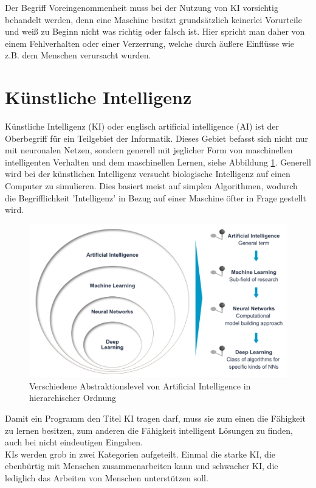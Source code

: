 \documentclass[12pt,oneside,a4paper,parskip]{scrbook}
\begin{document}
Der Begriff Voreingenommenheit muss bei der Nutzung von KI vorsichtig behandelt werden, denn eine Maschine besitzt grundsätzlich keinerlei Vorurteile und weiß zu Beginn nicht was richtig oder falsch ist. Hier spricht man daher von einem Fehlverhalten oder einer Verzerrung, welche durch äußere Einflüsse wie z.B. dem Menschen verursacht wurden.\\

\section{Künstliche Intelligenz}
Künstliche Intelligenz (KI) oder englisch artificial intelligence (AI) ist der Oberbegriff für ein Teilgebiet der Informatik. Dieses Gebiet befasst sich nicht nur mit neuronalen Netzen, sondern generell mit jeglicher Form von maschinellen intelligenten Verhalten und dem maschinellen Lernen, siehe Abbildung \ref{fig:Uebersicht}. Generell wird bei der künstlichen Intelligenz versucht biologische Intelligenz auf einen Computer zu simulieren. Dies basiert meist auf simplen Algorithmen, wodurch die Begrifflichkeit 'Intelligenz' in Bezug auf einer Maschine öfter in Frage gestellt wird.

\begin{figure}[ht]
	\begin{center}
		\includegraphics[width=14cm]{Bilder/Abstraktionslevel_von_AI.jpg}
		\caption{Verschiedene Abstraktionslevel von Artificial Intelligence in hierarchischer Ordnung}
		\label{fig:Uebersicht}
	\end{center}
\end{figure}
Damit ein Programm den Titel KI tragen darf, muss sie zum einen die Fähigkeit zu lernen besitzen, zum anderen die Fähigkeit intelligent Lösungen zu finden, auch bei nicht eindeutigen Eingaben.\\
KIs werden grob in zwei Kategorien aufgeteilt. Einmal die starke KI, die ebenbürtig mit Menschen zusammenarbeiten kann und schwacher KI, die lediglich das Arbeiten von Menschen unterstützen soll.
\end{document}
